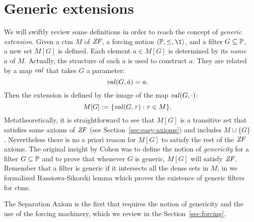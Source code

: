 \section{Generic extensions}
\label{sec:generic-extensions}
We will swiftly review some definitions in order to reach the concept
of \emph{generic extension}. Given a ctm $M$ of $\mathit{ZF}$, a forcing
notion $\lb\PP,\leq,\1\rb$, and a filter
$G\subseteq\mathbb{P}$, a new set $M[G]$ is defined. Each element $a\in M[G]$ is
determined by its \emph{name} $\dot a$ of $M$. Actually, the structure of
each $\dot a$ is used to construct $a$. They are related by a
map $\operatorname{\mathit{val}}$ that takes $G$ a parameter:
\[
\operatorname{\mathit{val}}(G,\dot a) = a.
\] 
Then the extension is defined by the image of the map $\operatorname{\mathit{val}}(G,\cdot)$:
\[
M[G] \mathrel{\mathop:}= \{\operatorname{\mathit{val}}(G,\tau): \tau\in M\}.
\]
Metatheoretically, it is straightforward to see that $M[G]$ is a
transitive set that satisfies some axioms of $\mathit{ZF}$ (see
Section~\ref{sec:easy-axioms}) and includes $M\cup\{G\}$. Nevertheless
there is no a priori reason for $M[G]$ to satisfy the rest of the
$\mathit{ZF}$ axioms. The original insight by Cohen was to define the notion
of \emph{genericity} for a filter $G\subseteq\mathbb{P}$ and to prove that
whenever $G$ is generic, $M[G]$ will satisfy $\mathit{ZF}$. Remember that a
filter is generic if it intersects all the dense sets in $M$; in
\cite{2018arXiv180705174G} we formalized Rassiowa-Sikorski lemma which
proves the existence of generic filters for ctms.

The Separation Axiom  is the first that requires the notion of
genericity and the use of the forcing machinery, which we review in
the Section~\ref{sec:forcing}.


